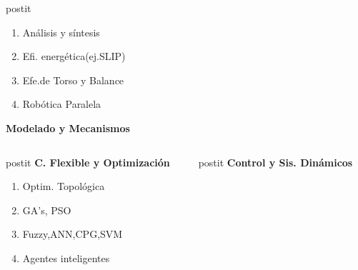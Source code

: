 {\begin{frame}[label=resumen]
\begin{center}
{\begin{columns}[c]
          \begin{column}{3cm}
            \begin{beamercolorbox}[sep=0.5em,wd=3cm,rounded=true,center,shadow=true]{postit}
              \begin{enumerate}\tiny
              \item An\'alisis y s\'intesis
              \item Efi. energ\'etica(ej.SLIP)
              \item Efe.de Torso y Balance
              \item Rob\'otica Paralela
              \end{enumerate}
              \textbf{Modelado y Mecanismos}
            \end{beamercolorbox}
          \end{column}
        \end{columns}
        \vspace{1.0cm}
        \begin{columns}[c]
          \begin{column}{3cm}
            \begin{beamercolorbox}[sep=0.5em,wd=3cm,rounded=true,center,shadow=true]{postit}
              \textbf{C. Flexible y Optimizaci\'on}
              \begin{enumerate}\tiny
              \item Optim. Topol\'ogica
              \item GA's, PSO
              \item Fuzzy,ANN,CPG,SVM
              \item Agentes inteligentes
              \end{enumerate}
            \end{beamercolorbox}
          \end{column}
          \begin{column}{3cm}
            \begin{beamercolorbox}[sep=0.5em,wd=3cm,rounded=true,center,shadow=true]{postit}
              \textbf{Control y Sis. Din\'amicos}
              \begin{enumerate}\tiny

\end{enumerate}
\end{beamercolorbox}
\end{column}
\end{columns}}
\end{center}
\end{frame}}
